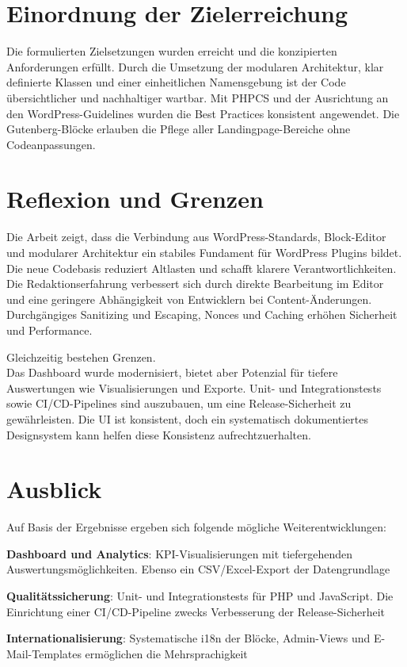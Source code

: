 \section{Einordnung der Zielerreichung}
Die formulierten Zielsetzungen wurden erreicht und die konzipierten Anforderungen erfüllt.
Durch die Umsetzung der modularen Architektur, klar definierte Klassen und einer einheitlichen Namensgebung ist der Code übersichtlicher und nachhaltiger wartbar.
Mit PHPCS und der Ausrichtung an den WordPress-Guidelines wurden die Best Practices konsistent angewendet.
Die Gutenberg-Blöcke erlauben die Pflege aller Landingpage-Bereiche ohne Codeanpassungen.

\section{Reflexion und Grenzen}
Die Arbeit zeigt, dass die Verbindung aus WordPress-Standards, Block-Editor und modularer Architektur ein stabiles Fundament für WordPress Plugins bildet.
Die neue Codebasis reduziert Altlasten und schafft klarere Verantwortlichkeiten.
Die Redaktionserfahrung verbessert sich durch direkte Bearbeitung im Editor und eine geringere Abhängigkeit von Entwicklern bei Content-Änderungen.
Durchgängiges Sanitizing und Escaping, Nonces und Caching erhöhen Sicherheit und Performance.


Gleichzeitig bestehen Grenzen.\\
Das Dashboard wurde modernisiert, bietet aber Potenzial für tiefere Auswertungen wie Visualisierungen und Exporte.
Unit- und Integrationstests sowie CI/CD-Pipelines sind auszubauen, um eine Release-Sicherheit zu gewährleisten.
Die UI ist konsistent, doch ein systematisch dokumentiertes Designsystem kann helfen diese Konsistenz aufrechtzuerhalten.
\newpage
\section{Ausblick}
Auf Basis der Ergebnisse ergeben sich folgende mögliche Weiterentwicklungen:

\textbf{Dashboard und Analytics}: KPI-Visualisierungen mit tiefergehenden Auswertungsmöglichkeiten. Ebenso ein CSV/Excel-Export der Datengrundlage

\textbf{Qualitätssicherung}: Unit- und Integrationstests für PHP und JavaScript. Die Einrichtung einer CI/CD-Pipeline zwecks Verbesserung der Release-Sicherheit

\textbf{Internationalisierung}: Systematische i18n der Blöcke, Admin-Views und E-Mail-Templates ermöglichen die Mehrsprachigkeit

